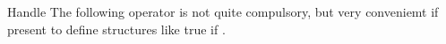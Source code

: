 \begin{ccRefConcept}{Handle}
The following operator is not quite compulsory, but very conveniemt if 
present to define structures like 
 {true if 
\ccc { &(*} \ccVar {} .}





\ccHasModels
{}








\end{ccRefConcept}


